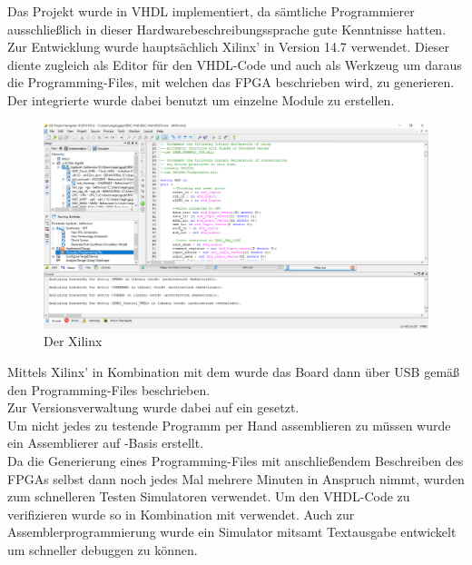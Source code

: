 Das Projekt wurde in VHDL implementiert, da s\"amtliche Programmierer ausschlie{\ss}lich in dieser Hardwarebeschreibungssprache gute Kenntnisse hatten.\\
Zur Entwicklung wurde haupts\"achlich Xilinx'  in Version 14.7 verwendet. Dieser diente zugleich als Editor f\"ur den VHDL-Code und auch als Werkzeug um daraus die Programming-Files, mit welchen das FPGA beschrieben wird, zu generieren. Der integrierte  wurde dabei benutzt um einzelne Module zu erstellen.\\
\begin{figure}[H]
	\centering
		\includegraphics[width=1.0\textwidth]{ISE.png}
	\caption[]{Der Xilinx }
	\label{fig:tool}
\end{figure}
Mittels Xilinx'  in Kombination mit dem  wurde das Board dann \"uber USB gem\"a{\ss} den Programming-Files beschrieben.\\
Zur Versionsverwaltung wurde dabei auf ein  gesetzt.\\ 
Um nicht jedes zu testende Programm per Hand assemblieren zu m\"ussen wurde ein Assemblierer auf -Basis erstellt.\\
Da die Generierung eines Programming-Files mit anschlie{\ss}endem Beschreiben des FPGAs selbst dann noch jedes Mal mehrere Minuten in Anspruch nimmt, wurden zum schnelleren Testen Simulatoren verwendet. Um den VHDL-Code zu verifizieren wurde so  in Kombination mit  verwendet. Auch zur Assemblerprogrammierung wurde ein Simulator mitsamt Textausgabe entwickelt um schneller debuggen zu k\"onnen.
